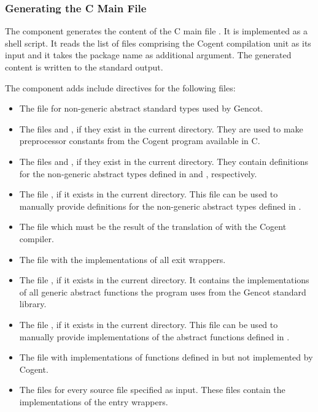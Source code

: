 \subsubsection{Generating the C Main File}

The component  generates the content of the C main file . 
It is implemented as a shell script. It reads the list of
 files comprising the Cogent compilation unit as its input and it takes the package name 
as additional argument. The generated content is written to the standard output. 

The component adds include directives for the following files:
\begin{itemize}
\item The file  for non-generic abstract standard types used by Gencot.
\item The files  and , if they exist in the current directory.
They are used to make preprocessor constants from the Cogent program available in C.
\item The files  and , if they exist in the current directory. 
They contain definitions for the non-generic abstract types defined in  and 
, respectively.
\item The file , if it exists in the current directory. This file can be used to
manually provide definitions for the non-generic abstract types defined in .
\item The file  which must be the result of the translation of 
with the Cogent compiler.
\item The file  with the implementations of all exit wrappers.
\item The file , if it exists in the current directory. It contains the 
implementations of all generic abstract functions the program uses from the Gencot standard library.
\item The file , if it exists in the current directory. This file can be used to
manually provide implementations of the abstract functions defined in .
\item The file  with implementations of functions defined in 
but not implemented by Cogent.
\item The files  for every source file  specified as input. These files contain
the implementations of the entry wrappers.
\end{itemize}
